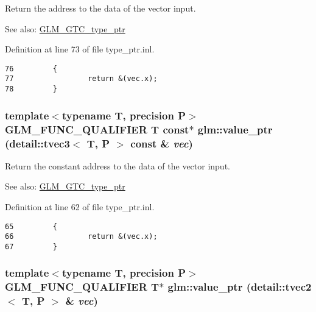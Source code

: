 Return the address to the data of the vector input. \begin{Desc}
\item[See also:]\hyperlink{group__gtc__type__ptr}{GLM\_\-GTC\_\-type\_\-ptr} \end{Desc}


Definition at line 73 of file type\_\-ptr.inl.

\begin{Code}\begin{verbatim}76         {
77                 return &(vec.x);
78         }
\end{verbatim}
\end{Code}


\hypertarget{group__gtc__type__ptr_g5668973c91b739c1a19f0ef201ddce50}{
\subsubsection[value\_\-ptr]{\setlength{\rightskip}{0pt plus 5cm}template$<$typename T, precision P$>$ GLM\_\-FUNC\_\-QUALIFIER T const$\ast$ glm::value\_\-ptr (detail::tvec3$<$ T, P $>$ const \& {\em vec})}}
\label{group__gtc__type__ptr_g5668973c91b739c1a19f0ef201ddce50}


Return the constant address to the data of the vector input. \begin{Desc}
\item[See also:]\hyperlink{group__gtc__type__ptr}{GLM\_\-GTC\_\-type\_\-ptr} \end{Desc}


Definition at line 62 of file type\_\-ptr.inl.

\begin{Code}\begin{verbatim}65         {
66                 return &(vec.x);
67         }
\end{verbatim}
\end{Code}


\hypertarget{group__gtc__type__ptr_gfb7060ef2ca0edab610e0069ed911531}{
\subsubsection[value\_\-ptr]{\setlength{\rightskip}{0pt plus 5cm}template$<$typename T, precision P$>$ GLM\_\-FUNC\_\-QUALIFIER T$\ast$ glm::value\_\-ptr (detail::tvec2$<$ T, P $>$ \& {\em vec})}}
\label{group__gtc__type__ptr_gfb7060ef2ca0edab610e0069ed911531}


